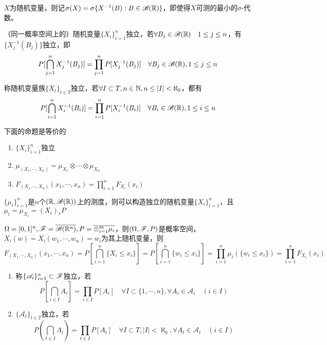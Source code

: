 \documentclass{ctexbook}
\begin{document}
$X$为随机变量，则记$\sigma(X)=\sigma\{X^{-1}(B):B\in \mathscr{B}(\mathbb{R})\}$，即使得$X$可测的最小的$\sigma$-代数。

\begin{Def}[随机变量的独立性]
  （同一概率空间上的）随机变量$\{X_{i}\}_{i=1}^{n}$独立，若$\forall B_{j}\in\mathscr{B}(\mathbb{R})\quad 1\leq j\leq n$，有$\{X_{j}^{-1}(B_{j})\}$独立，即
  \[P[\bigcap_{j=1}^{n}X_{j}^{-1}(B_{j})]=\prod_{j=1}^{n}P[X_{j}^{-1}(B_{j})]\quad \forall B_{j}\in\mathscr{B}(\mathbb{R}), 1\leq j\leq n\]

  称随机变量族$\{X_{t}\}_{t\in T}$独立，若$\forall I\subset T, n\in\mathbb{N}, n\leq |I|<\aleph_{0}$，都有
 \[P[\bigcap_{i=1}^{n}X_{i}^{-1}(B_{i})]=\prod_{i=1}^{n}P[X_{i}^{-1}(B_{i})]\quad \forall B_{i}\in\mathscr{B}(\mathbb{R}), 1\leq i\leq n\]
\end{Def}

\begin{Prop}
  下面的命题是等价的
  \begin{enumerate}
  \item $\{X_{i}\}_{i=1}^{n}$独立
  \item $\mu_{(X_{1},\cdots,X_{n})}=\mu_{X_{1}}\otimes\cdots\otimes \mu_{X_{n}}$
  \item $F_{(X_{1},\cdots,X_{n})}(x_{1},\cdots,x_{n})=\prod_{i=1}^{n}F_{X_{i}}(x_{i})$
  \end{enumerate}
\end{Prop}

\begin{Eg}
  $\{\mu_{i}\}_{i=1}^{n}$是$n$个$(\mathbb{R},\mathscr{B}(\mathbb{R}))$上的测度，则可以构造独立的随机变量$\{X_{i}\}_{i=1}^{n}$，且$\mu_{i}=\mu_{X_{i}}=(X_{i})_{*}P$

  $\Omega=[0,1]^{n},\mathscr{F}=\overline{\mathscr{B}(\mathbb{R}^{n})}, P=\overline{\otimes_{i=1}^{m}\mu_{i}}$，则$(\Omega,\mathscr{F},P)$是概率空间，$X_{i}(w)=X_{i}(w_{1},\cdots,w_{n})=w_{i}$为其上随机变量，则
  \[F_{(X_{1},\cdots,X_{n})}(x_{1},\cdots,x_{n})=P[\bigcap_{i=1}^{n}\{X_{i}\leq x_{i}\}]=P[\bigcap_{i=1}^{n}\{w_{i}\leq x_{i}\}]=\prod_{i=1}^{n}\mu_{i}(\{w_{i}\leq x_{i}\})=\prod_{i=1}^{n}F_{X_{i}}(x_{i})\]
\end{Eg}

\newcommand{\A}{\mathscr{A}}

\begin{Def}[事件系族的独立性]
  \begin{enumerate}
  \item 称$\{\A_{i}\}_{i=1}^{n}\subset \F$独立，若
    \[P[\bigcap_{i\in I}A_{i}]=\prod_{i\in I}P[A_{i}]\quad \forall I\subset\{1,\cdots, n\},\forall A_{i}\in\A_{i}\quad (i\in I)\]
\item $\{\A_{t}\}_{t\in T}$独立，若\[P(\bigcap_{t\in I}A_{t})=\prod_{t\in I} P[A_{t}]\quad \forall I\subset T, |I|<\aleph_{0}, \forall A_{t}\in\A_{t}\quad(i\in I)\]
  \end{enumerate}
\end{Def}
\end{document}
